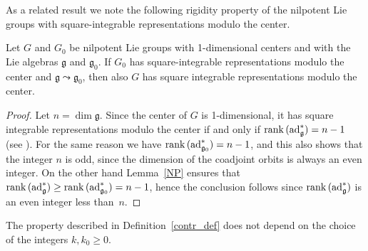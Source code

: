 \documentclass[
reqno]{amsart}
\begin{document}
As a related result we note the following rigidity property of the nilpotent Lie groups with square-integrable representations modulo the center. 

\begin{proposition}
Let $G$ and $G_0$ be nilpotent Lie groups with 1-dimensional centers and with the Lie algebras ${{\mathfrak g}}$ and ${{\mathfrak g}}_0$. 
If $G_0$ has square-integrable representations modulo the center and ${{\mathfrak g}}{\leadsto}{{\mathfrak g}}_0$, 
then also $G$ has square integrable representations modulo the center. 
\end{proposition}

\begin{proof} 
Let $n=\dim{{\mathfrak g}}$. 
Since the center of $G$ is 1-dimensional, 
it has square integrable representations modulo the center if and only if ${{\rm rank}\,}({{\rm ad}}^*_{{\mathfrak g}})=n-1$ 
(see \cite{MW73}). 
For the same reason we have ${{\rm rank}\,}({{\rm ad}}^*_{{{\mathfrak g}}_0})=n-1$, 
and this also shows that the integer $n$ is odd, since the dimension of the coadjoint orbits is always an even integer. 
On the other hand 
Lemma~\ref{NP} ensures that ${{\rm rank}\,}({{\rm ad}}^*_{{\mathfrak g}})\ge{{\rm rank}\,}({{\rm ad}}^*_{{{\mathfrak g}}_0})=n-1$,  
hence the conclusion follows since ${{\rm rank}\,}({{\rm ad}}^*_{{\mathfrak g}})$ is an even integer less than~$n$. 
\end{proof}

\begin{proposition}\label{18sept2013}
The property described in Definition~\ref{contr_def} does not depend on the choice of the integers $k,k_0\ge 0$. 
\end{proposition}
\end{document}
